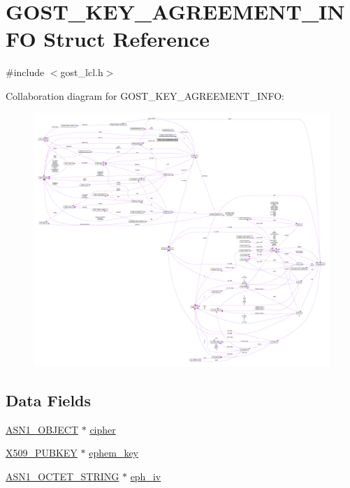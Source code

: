 \hypertarget{struct_g_o_s_t___k_e_y___a_g_r_e_e_m_e_n_t___i_n_f_o}{}\section{G\+O\+S\+T\+\_\+\+K\+E\+Y\+\_\+\+A\+G\+R\+E\+E\+M\+E\+N\+T\+\_\+\+I\+N\+FO Struct Reference}
\label{struct_g_o_s_t___k_e_y___a_g_r_e_e_m_e_n_t___i_n_f_o}


{\ttfamily \#include $<$gost\+\_\+lcl.\+h$>$}



Collaboration diagram for G\+O\+S\+T\+\_\+\+K\+E\+Y\+\_\+\+A\+G\+R\+E\+E\+M\+E\+N\+T\+\_\+\+I\+N\+FO\+:\nopagebreak
\begin{figure}[H]
\begin{center}
\leavevmode
\includegraphics[width=350pt]{struct_g_o_s_t___k_e_y___a_g_r_e_e_m_e_n_t___i_n_f_o__coll__graph}
\end{center}
\end{figure}
\subsection*{Data Fields}
\begin{DoxyCompactItemize}
\item 
\hyperlink{crypto_2ossl__typ_8h_ae3fda0801e4c8e250087052bafb3ce2e}{A\+S\+N1\+\_\+\+O\+B\+J\+E\+CT} $\ast$ \hyperlink{struct_g_o_s_t___k_e_y___a_g_r_e_e_m_e_n_t___i_n_f_o_ab0a428f66ea6837b0236a2acbd27102e}{cipher}
\item 
\hyperlink{crypto_2ossl__typ_8h_a9183376ae13a86ca35c75edf5412b914}{X509\+\_\+\+P\+U\+B\+K\+EY} $\ast$ \hyperlink{struct_g_o_s_t___k_e_y___a_g_r_e_e_m_e_n_t___i_n_f_o_a555df1ba7938d0a1cd0cd43a68f9f90c}{ephem\+\_\+key}
\item 
\hyperlink{crypto_2ossl__typ_8h_afbd05e94e0f0430a2b729473efec88c1}{A\+S\+N1\+\_\+\+O\+C\+T\+E\+T\+\_\+\+S\+T\+R\+I\+NG} $\ast$ \hyperlink{struct_g_o_s_t___k_e_y___a_g_r_e_e_m_e_n_t___i_n_f_o_afad9b0ce8352efbcc49b0af5ad965c62}{eph\+\_\+iv}
\end{DoxyCompactItemize}


